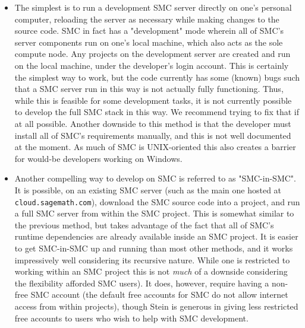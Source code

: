 \documentclass{deliverablereport}
\begin{document}
\begin{itemize}
    \item The simplest is to run a development SMC server directly on one's
        personal computer, reloading the server as necessary while making
        changes to the source code.  SMC in fact has a "development" mode
        wherein all of SMC's server components run on one's local machine,
        which also acts as the sole compute node.  Any projects on the
        development server are created and run on the local machine, under the
        developer's login account.  This is certainly the simplest way to work,
        but the code currently has some (known) bugs such that a SMC server run
        in this way is not actually fully functioning.  Thus, while this is
        feasible for some development tasks, it is not currently possible to
        develop the full SMC stack in this way.  We recommend trying to fix
        that if at all possible.  Another downside to this method is that the
        developer must install all of SMC's requirements manually, and this is
        not well documented at the moment.  As much of SMC is UNIX-oriented
        this also creates a barrier for would-be developers working on Windows.

    \item Another compelling way to develop on SMC is referred to as
        "SMC-in-SMC".  It is possible, on an existing SMC server (such as the
        main one hosted at {\tt cloud.sagemath.com}), download the SMC source
        code into a project, and run a full SMC server from within the SMC
        project.  This is somewhat similar to the previous method, but takes
        advantage of the fact that all of SMC's runtime dependencies are
        already available inside an SMC project.  It is easier to get
        SMC-in-SMC up and running than most other methods, and it works
        impressively well considering its recursive nature.  While one is
        restricted to working within an SMC project this is not \emph{much} of
        a downside considering the flexibility afforded SMC users).  It does,
        however, require having a non-free SMC account (the default free
        accounts for SMC do not allow internet access from within projects),
        though Stein is generous in giving less restricted free accounts to
        users who wish to help with SMC development.


\end{itemize}
\end{document}
